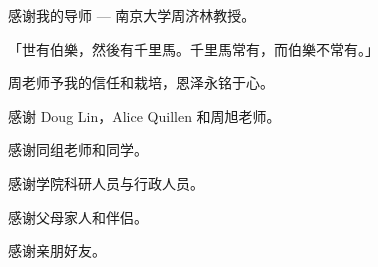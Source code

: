 \begin{acknowledgement}

感谢我的导师 --- 南京大学周济林教授。

「世有伯樂，然後有千里馬。千里馬常有，而伯樂不常有。」

周老师予我的信任和栽培，恩泽永铭于心。

感谢 Doug Lin，Alice Quillen 和周旭老师。

感谢同组老师和同学。

感谢学院科研人员与行政人员。

感谢父母家人和伴侣。

感谢亲朋好友。

\end{acknowledgement}
